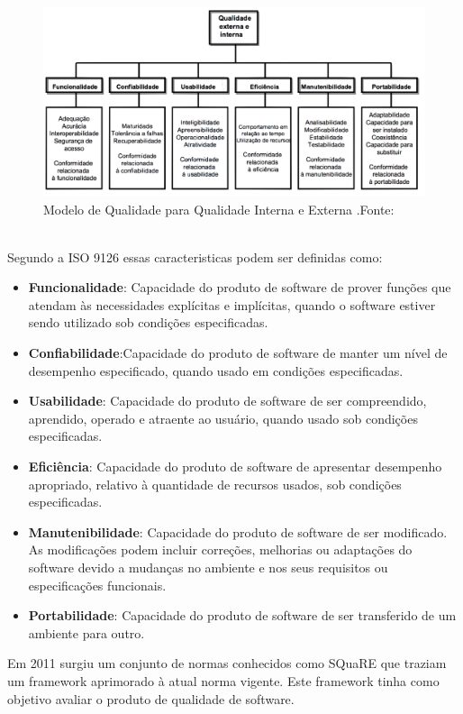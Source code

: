 \graphicspath{{figuras/}}
\begin{figure}[h]
\centering
\includegraphics[scale=0.50]{Modelo_de_Qualidade}
\caption{Modelo de Qualidade para Qualidade Interna e Externa .Fonte:\cite{_nbr_2016}}
\label{img:modelo_qualidade}
\end{figure}
\\Segundo a ISO 9126 essas caracteristicas podem ser definidas como:
\begin{itemize}
\item \textbf{Funcionalidade}: Capacidade do produto de software de prover funções que atendam às necessidades explícitas e implícitas, quando o software estiver sendo utilizado sob condições especificadas.
\item \textbf{Confiabilidade}:Capacidade do produto de software de manter um nível de desempenho especificado, quando usado em condições especificadas.
\item \textbf{Usabilidade}: Capacidade do produto de software de ser compreendido, aprendido, operado e atraente ao usuário, quando usado sob condições especificadas.
\item \textbf{Eficiência}: Capacidade do produto de software de apresentar desempenho apropriado, relativo à quantidade de recursos usados, sob condições especificadas.
\item \textbf{Manutenibilidade}: Capacidade do produto de software de ser modificado. As modificações podem incluir correções, melhorias ou adaptações do software devido a mudanças no ambiente e nos seus requisitos ou especificações funcionais.
\item \textbf{Portabilidade}: Capacidade do produto de software de ser transferido de um ambiente para outro.
\end{itemize}
Em 2011 surgiu um conjunto de normas conhecidos como SQuaRE que traziam um framework aprimorado à atual norma vigente. Este framework tinha como objetivo avaliar o produto de qualidade de software.

